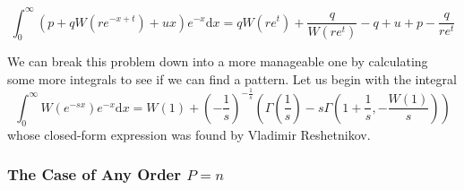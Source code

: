 \documentclass{amsart}
\newcommand{\mathd}{\mathrm{d}}
\newcommand{\noplus}{}
\begin{document}
\begin{equation}
  \int_0^{\infty} ( p + q W ( r e^{- x + t}) + u x) e^{- x} \mathd x = q W ( r
  e^t) + \frac{q}{W ( r e^t)} - q + u + p - \frac{q}{r e^t} 
\end{equation}

We can break this problem down into a more manageable one by calculating some
more integrals to see if we can find a pattern. Let us begin with the integral
\begin{equation}
  \int_0^{\infty} W ( e^{- s x}) e^{- x} \mathd x = W ( 1) \noplus + \left( -
  \frac{1}{s} \right)^{- \frac{1}{s}}  \left( \Gamma \left( \frac{1}{s}
  \right) - s \Gamma \left( 1 + \frac{1}{s}, - \frac{W ( 1)}{s} \right)
  \right)
\end{equation}
whose closed-form expression was found by Vladimir Reshetnikov. {\cite{vr-W}}

\subsubsection{The Case of Any Order $P = n$}
\end{document}
